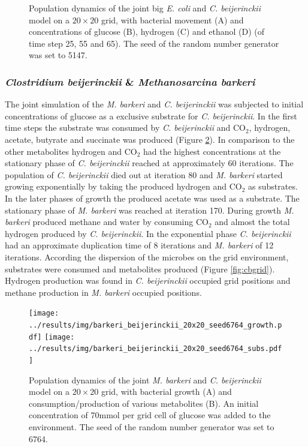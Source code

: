 \begin{figure}[h!]
{\begin{minipage}[t]{0.3\textwidth}
  \end{minipage}
  }
  \caption{Population dynamics of the joint big \emph{E. coli} and \emph{C. beijerinckii} model on a $20\times20$ grid, with bacterial movement (A) and concentrations of glucose (B), hydrogen (C) and ethanol (D) (of time step 25, 55 and 65). The seed of the random number generator was set to 5147.}
  \label{fig:cegrid}
\end{figure}

\subsubsection{\textit{Clostridium beijerinckii} \& \textit{Methanosarcina barkeri}}
The joint simulation of the \textit{M. barkeri} and \textit{C. beijerinckii} was subjected to initial concentrations of glucose as a exclusive substrate for \textit{C. beijerinckii}. In the first time steps the substrate was consumed by \textit{C. beijerinckii} and CO$_2$, hydrogen, acetate, butyrate and succinate was produced (Figure \hyperref[fig:cbsg]{\ref{fig:cbsg}}). 
In comparison to the other metabolites hydrogen and CO$_2$ had the highest concentrations at the stationary phase of \textit{C. beijerinckii} reached at approximately 60 iterations. The population of \textit{C. beijerinckii} died out at iteration 80 and \textit{M. barkeri} started growing exponentially by taking the produced hydrogen and CO$_2$ as substrates. 
In the later phases of growth the produced acetate was used as a substrate. The stationary phase of \textit{M. barkeri} was reached at iteration 170. 
During growth \textit{M. barkeri} produced methane and water by consuming CO$_2$ and almost the total hydrogen produced by \textit{C. beijerinckii}. 
In the exponential phase \textit{C. beijerinckii} had an approximate duplication time of 8 iterations and \textit{M. barkeri} of 12 iterations.
According the dispersion of the microbes on the grid environment, substrates were consumed and metabolites produced (Figure \hyperref[fig:cbgrid]{\ref{fig:cbgrid}}). Hydrogen production was found in \textit{C. beijerinckii} occupied grid positions and methane production in \textit{M. barkeri} occupied positions.
\begin{figure}[h!]
  \centering
    \texttt{[image: ../results/img/barkeri\_beijerinckii\_20x20\_seed6764\_growth.pdf]}
    \texttt{[image: ../results/img/barkeri\_beijerinckii\_20x20\_seed6764\_subs.pdf]}
  \caption{Population dynamics of the joint \emph{M. barkeri} and \emph{C. beijerinckii} model on a $20\times20$ grid, with bacterial growth (A) and consumption/production of various metabolites (B). An initial concentration of 70\;mmol per grid cell of glucose was added to the environment. The seed of the random number generator was set to 6764.}
  \label{fig:cbsg}
\end{figure}
